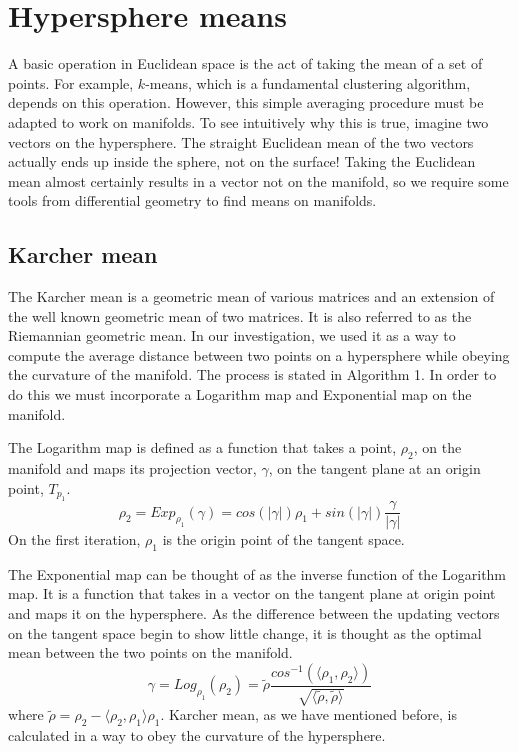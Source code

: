 \documentclass[../tech_report_1.tex]{subfiles}
\begin{document}
\section{Hypersphere means}

A basic operation in Euclidean space is the act of taking the mean of a set of points. For example, $k$-means, which is a fundamental clustering algorithm, depends on this operation. However, this simple averaging procedure must be adapted to work on manifolds. To see intuitively why this is true, imagine two vectors on the hypersphere. The straight Euclidean mean of the two vectors actually ends up inside the sphere, not on the surface! Taking the Euclidean mean almost certainly results in a vector not on the manifold, so we require some tools from differential geometry to find means on manifolds.

\subsection{Karcher mean}

The Karcher mean is a geometric mean of various matrices and an extension
of the well known geometric mean of two matrices. It is also referred
to as the Riemannian geometric mean. In our investigation, we used
it as a way to compute the average distance between two points on
a hypersphere while obeying the curvature of the manifold. The process
is stated in Algorithm 1. In order to do this we must incorporate a
Logarithm map and Exponential map on the manifold. 


The Logarithm map is defined as a function that takes a point, $\rho_{2}$,
on the manifold and maps its projection vector, $\gamma$, on the
tangent plane at an origin point, $T_{p_{1}}$. 
\begin{equation}
\rho_{2}=Exp_{\rho_{1}}(\gamma)=cos(|\gamma|)\rho_{1}+sin(|\gamma|)\frac{\gamma}{|\gamma|}\label{eq:1}
\end{equation}
On the first iteration, $\rho_{1}$ is the origin point of the tangent
space.

The Exponential map can be thought of as the inverse function of the
Logarithm map. It is a function that takes in a vector on the tangent
plane at origin point and maps it on the hypersphere. As the difference
between the updating vectors on the tangent space begin to show little
change, it is thought as the optimal mean between the two points on
the manifold.
\begin{equation}
\gamma=Log_{\rho_{1}}(\rho_{2})=\tilde{\rho}\frac{cos^{-1}(\langle\rho_{1},\rho_{2}\rangle)}{\sqrt{\langle\tilde{\rho},\tilde{\rho}\rangle}}\label{eq:2}
\end{equation}
where $\tilde{\rho}=\rho_{2}-\langle\rho_{2},\rho_{1}\rangle\rho_{1}$.
Karcher mean, as we have mentioned before, is calculated in a way
to obey the curvature of the hypersphere.
\end{document}
